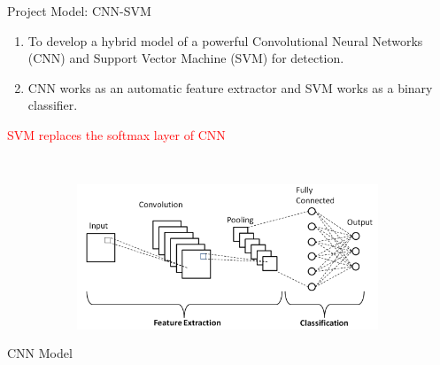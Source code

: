 \documentclass{beamer}
\begin{document}
\begin{frame}{Project Model: CNN-SVM}
\begin{enumerate}
    \item To develop a hybrid model of a powerful Convolutional Neural Networks (CNN) and Support Vector Machine (SVM) for detection.
    \item CNN works as an automatic feature extractor and SVM works as a binary classifier. 
\end{enumerate}
\begin{center}
    \textcolor{red}{SVM replaces the softmax layer of CNN}
\end{center}
\end{frame}
\begin{frame}{CNN Model}
\centering
    \includegraphics[width=9cm, height=6cm]{Simpleblock.PNG}
\end{frame}
\end{document}
